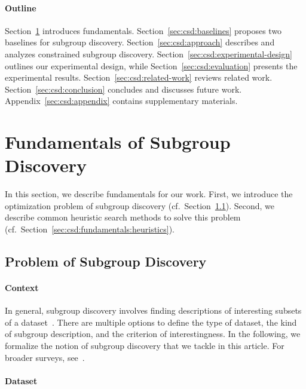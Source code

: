 \documentclass{article}
\theoremstyle{definition}
\begin{document}
\paragraph{Outline}

Section~\ref{sec:csd:fundamentals} introduces fundamentals.
Section~\ref{sec:csd:baselines} proposes two baselines for subgroup discovery.
Section~\ref{sec:csd:approach} describes and analyzes constrained subgroup discovery.
Section~\ref{sec:csd:experimental-design} outlines our experimental design, while Section~\ref{sec:csd:evaluation} presents the experimental results.
Section~\ref{sec:csd:related-work} reviews related work.
Section~\ref{sec:csd:conclusion} concludes and discusses future work.
Appendix~\ref{sec:csd:appendix} contains supplementary materials.

\section{Fundamentals of Subgroup Discovery}
\label{sec:csd:fundamentals}

In this section, we describe fundamentals for our work.
First, we introduce the optimization problem of subgroup discovery (cf.~Section~\ref{sec:csd:fundamentals:problem}).
Second, we describe common heuristic search methods to solve this problem (cf.~Section~\ref{sec:csd:fundamentals:heuristics}).

\subsection{Problem of Subgroup Discovery}
\label{sec:csd:fundamentals:problem}

\paragraph{Context}

In general, subgroup discovery involves finding descriptions of interesting subsets of a dataset~\cite{atzmueller2015subgroup}.
There are multiple options to define the type of dataset, the kind of subgroup description, and the criterion of interestingness.
In the following, we formalize the notion of subgroup discovery that we tackle in this article.
For broader surveys, see~\cite{atzmueller2015subgroup, helal2016subgroup, herrera2011overview, ventura2018subgroup}.

\paragraph{Dataset}
\end{document}

